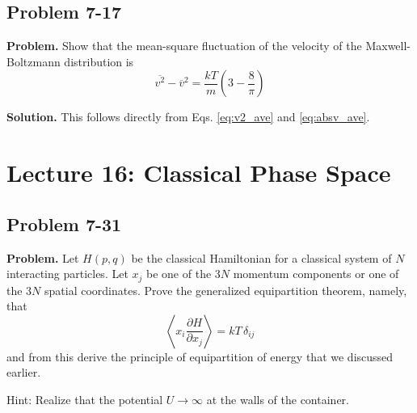 \documentclass[twocolumn, 10pt]{article}
\numberwithin{equation}{section}
\newenvironment{problem}
{\par\medskip\sffamily \color{problue}
  \textbf{Problem. }\ignorespaces}
{\medskip}
\newenvironment{solution}
{\par\medskip
  \textbf{Solution. }\ignorespaces}
{\medskip}
\begin{document}
\subsection{Problem 7-17}

\begin{problem}
  Show that the mean-square fluctuation of
  the velocity of the Maxwell-Boltzmann distribution
  is
  $$
  \overline{ v^2 } - \overline{v}^2
  =
  \frac{ k T } { m }
  \left(3 - \frac{8}{\pi} \right)
  $$
\end{problem}

\begin{solution}
  This follows directly from Eqs.
  \eqref{eq:v2_ave} and \eqref{eq:absv_ave}.
\end{solution}

\section{Lecture 16: Classical Phase Space}

\subsection{Problem 7-31}

\begin{problem}
  Let $H(p, q)$ be the classical Hamiltonian
  for a classical system of $N$ interacting particles.
  Let $x_j$ be one of the $3N$ momentum components
  or one of the $3N$ spatial coordinates.
  Prove the generalized equipartition theorem, namely, that
  $$
  \left\langle
    x_i \frac{ \partial H } { \partial x_j }
  \right\rangle
  = kT \, \delta_{ij}
  $$
  and from this derive the principle
  of equipartition of energy that we discussed earlier.

  Hint: Realize that the potential $U \to \infty$
  at the walls of the container.
\end{problem}
\end{document}
